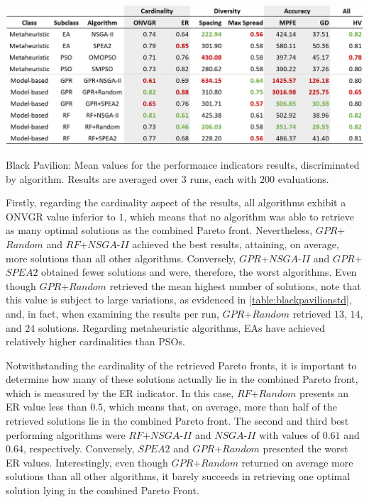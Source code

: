 \begin{table}[htbp]
	\centering
	\includegraphics[width=\textwidth]{Images/Evaluation/BlackPavilion/Results_Mean_20190428.PNG}
	\caption[Black Pavilion: Mean values for the performance indicators results, discriminated by algorithm]{Black Pavilion: Mean values for the performance indicators results, discriminated by algorithm. Results are averaged over $3$ runs, each with $200$ evaluations.}
	\label{table:blackpavilion}
\end{table}

Firstly, regarding the cardinality aspect of the results, all algorithms exhibit a \ac{ONVGR} value inferior to $1$, which means that no algorithm was able to retrieve as many optimal solutions as the combined Pareto front. Nevertheless, $GPR$+$Random$ and $RF$+$NSGA$-$II$ achieved the best results, attaining, on average, more solutions than all other algorithms. Conversely, $GPR$+$NSGA$-$II$ and $GPR$+$SPEA2$ obtained fewer solutions and were, therefore, the worst algorithms. Even though $GPR$+$Random$ retrieved the mean highest number of solutions, note that this value is subject to large variations, as evidenced in \cref{table:blackpavilionstd}, and, in fact, when examining the results per run, $GPR$+$Random$ retrieved $13$, $14$, and $24$ solutions. Regarding metaheuristic algorithms, \acp{EA} have achieved relatively higher cardinalities than \acp{PSO}. 

Notwithstanding the cardinality of the retrieved Pareto fronts, it is important to determine how many of these solutions actually lie in the combined Pareto front, which is measured by the \ac{ER} indicator. In this case, $RF$+$Random$ presents an \ac{ER} value less than $0.5$, which means that, on average, more than half of the retrieved solutions lie in the combined Pareto front. The second and third best performing algorithms were $RF$+$NSGA$-$II$ and $NSGA$-$II$ with values of $0.61$ and $0.64$, respectively. Conversely, $SPEA2$ and $GPR$+$Random$ presented the worst \ac{ER} values. Interestingly, even though $GPR$+$Random$ returned on average more solutions than all other algorithms, it barely succeeds in retrieving one optimal solution lying in the combined Pareto Front.

